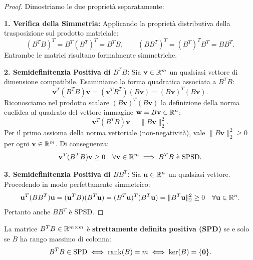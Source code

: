 \begin{proof}
Dimostriamo le due propriet\`a separatamente:

\medskip
\noindent\textbf{1. Verifica della Simmetria:}
Applicando la propriet\`a distributiva della trasposizione sul prodotto matriciale:
\begin{equation}
    (B^T B)^T = B^T (B^T)^T = B^T B, \qquad (B B^T)^T = (B^T)^T B^T = B B^T.
\end{equation}
Entrambe le matrici risultano formalmente simmetriche.

\medskip
\noindent\textbf{2. Semidefinitenzia Positiva di $B^T B$:}
Sia $\mathbf{v} \in \mathbb{R}^m$ un qualsiasi vettore di dimensione compatibile. Esaminiamo la forma quadratica associata a $B^T B$:
\begin{equation}
    \mathbf{v}^T (B^T B) \mathbf{v} = (\mathbf{v}^T B^T)(B \mathbf{v}) = (B \mathbf{v})^T (B \mathbf{v}).
\end{equation}
Riconosciamo nel prodotto scalare $(B\mathbf{v})^T (B\mathbf{v})$ la definizione della norma euclidea al quadrato del vettore immagine $\mathbf{w} = B\mathbf{v} \in \mathbb{R}^n$:
\begin{equation}
    \mathbf{v}^T (B^T B) \mathbf{v} = \|B \mathbf{v}\|_2^2.
\end{equation}
Per il primo assioma della norma vettoriale (non-negativit\`a), vale $\|B \mathbf{v}\|_2^2 \ge 0$ per ogni $\mathbf{v} \in \mathbb{R}^m$. Di conseguenza:
\begin{equation}
    \mathbf{v}^T (B^T B) \mathbf{v} \ge 0 \quad \forall \mathbf{v} \in \mathbb{R}^m \implies B^T B \text{ \`e SPSD}.
\end{equation}

\medskip
\noindent\textbf{3. Semidefinitenzia Positiva di $B B^T$:}
Sia $\mathbf{u} \in \mathbb{R}^n$ un qualsiasi vettore. Procedendo in modo perfettamente simmetrico:
\begin{equation}
    \mathbf{u}^T (B B^T) \mathbf{u} = (\mathbf{u}^T B)(B^T \mathbf{u}) = (B^T \mathbf{u})^T (B^T \mathbf{u}) = \|B^T \mathbf{u}\|_2^2 \ge 0 \quad \forall \mathbf{u} \in \mathbb{R}^n.
\end{equation}
Pertanto anche $B B^T$ \`e SPSD.
\end{proof}

\begin{corollary}
La matrice $B^T B \in \mathbb{R}^{m \times m}$ \`e \textbf{strettamente definita positiva (SPD)} se e solo se $B$ ha rango massimo di colonna:
\begin{equation}
    B^T B \in \text{SPD} \iff \operatorname{rank}(B) = m \iff \ker(B) = \{\mathbf{0}\}.
\end{equation}
\end{corollary}

